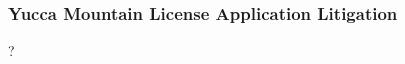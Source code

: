 
\begin{frame}[ctb!]
    \frametitle{Yucca Mountain License Application Litigation}
    ?

  \end{frame}
